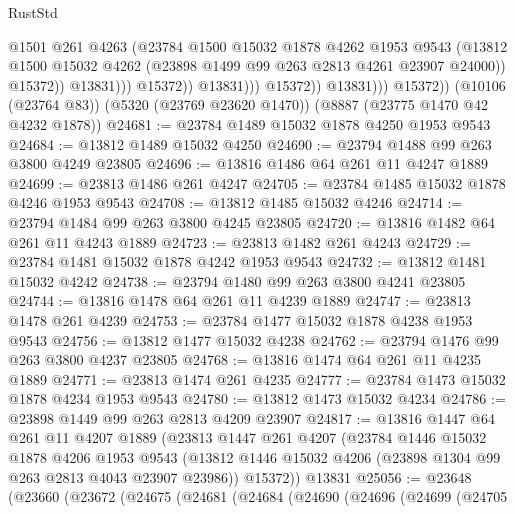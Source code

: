 \begin{lexlean}{RustStd}
\begin{coremodule}
                                    @1501
                                    @261
                                    @4263
                                    (@23784
                                      @1500
                                      @15032
                                      @1878
                                      @4262
                                      @1953
                                      @9543
                                      (@13812
                                        @1500
                                        @15032
                                        @4262
                                        (@23898 @1499 @99 @263 @2813 @4261 @23907 @24000))
                                      @15372))
                                  @13831)))
                            @15372))
                        @13831)))
                  @15372))
              @13831)))
        @15372))
    (@10106 (@23764 @83))
    (@5320 (@23769 @23620 @1470))
    (@8887 (@23775 @1470 @42 @4232 @1878))
@24681 := @23784 @1489 @15032 @1878 @4250 @1953 @9543
@24684 := @13812 @1489 @15032 @4250
@24690 := @23794 @1488 @99 @263 @3800 @4249 @23805
@24696 := @13816 @1486 @64 @261 @11 @4247 @1889
@24699 := @23813 @1486 @261 @4247
@24705 := @23784 @1485 @15032 @1878 @4246 @1953 @9543
@24708 := @13812 @1485 @15032 @4246
@24714 := @23794 @1484 @99 @263 @3800 @4245 @23805
@24720 := @13816 @1482 @64 @261 @11 @4243 @1889
@24723 := @23813 @1482 @261 @4243
@24729 := @23784 @1481 @15032 @1878 @4242 @1953 @9543
@24732 := @13812 @1481 @15032 @4242
@24738 := @23794 @1480 @99 @263 @3800 @4241 @23805
@24744 := @13816 @1478 @64 @261 @11 @4239 @1889
@24747 := @23813 @1478 @261 @4239
@24753 := @23784 @1477 @15032 @1878 @4238 @1953 @9543
@24756 := @13812 @1477 @15032 @4238
@24762 := @23794 @1476 @99 @263 @3800 @4237 @23805
@24768 := @13816 @1474 @64 @261 @11 @4235 @1889
@24771 := @23813 @1474 @261 @4235
@24777 := @23784 @1473 @15032 @1878 @4234 @1953 @9543
@24780 := @13812 @1473 @15032 @4234
@24786 := @23898 @1449 @99 @263 @2813 @4209 @23907
@24817 := @13816
    @1447
    @64
    @261
    @11
    @4207
    @1889
    (@23813
      @1447
      @261
      @4207
      (@23784
        @1446
        @15032
        @1878
        @4206
        @1953
        @9543
        (@13812 @1446 @15032 @4206 (@23898 @1304 @99 @263 @2813 @4043 @23907 @23986))
        @15372))
    @13831
@25056 := @23648
    (@23660
      (@23672
        (@24675
          (@24681
            (@24684
              (@24690
                (@24696
                  (@24699
                    (@24705

\end{coremodule}
\end{lexlean}
